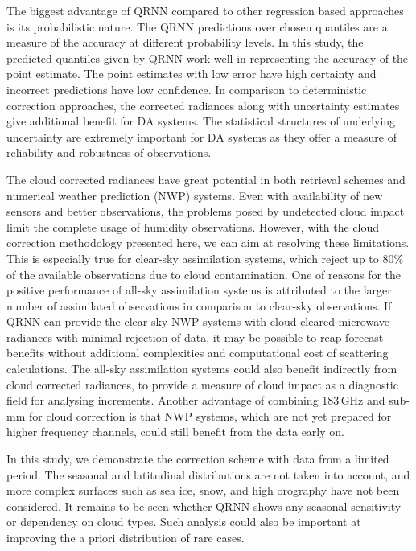 \documentclass[amt, manuscript]{copernicus}
\begin{document}
The biggest advantage of QRNN compared to other regression based approaches is its probabilistic nature. The QRNN predictions over chosen quantiles are a measure of the accuracy at different probability levels. In this study, the predicted quantiles given by QRNN work well in representing the accuracy of the point estimate. The point estimates with low error have high certainty and incorrect predictions have low confidence. In comparison to deterministic correction approaches, the corrected radiances along with uncertainty estimates give additional benefit for DA systems. The statistical structures of underlying uncertainty are extremely important for DA systems as they offer a measure of reliability and robustness of observations.

The cloud corrected radiances have great potential in both retrieval schemes and numerical weather prediction (NWP) systems. Even with availability of new sensors and better observations, the problems posed by undetected cloud impact limit the complete usage of humidity observations. However, with the cloud correction methodology presented here, we can aim at resolving these limitations. This is especially true for clear-sky assimilation systems, which reject up to 80\% of the available observations due to cloud contamination. One of reasons for the positive performance of all-sky assimilation systems is attributed to the larger number of assimilated observations in comparison to clear-sky observations. If QRNN can provide the clear-sky NWP systems with cloud cleared microwave radiances with minimal rejection of data, it may be possible to reap forecast benefits without additional complexities and computational cost of scattering calculations. The all-sky assimilation systems could also benefit indirectly from cloud corrected radiances, to provide a measure of cloud impact as a diagnostic field for analysing increments. Another advantage of combining 183\,GHz and sub-mm for cloud correction is that NWP systems, which are not yet prepared for higher frequency channels, could still benefit from the data early on. 

In this study, we demonstrate the correction scheme with data from a limited period. The seasonal and latitudinal distributions are not taken into account, and more complex surfaces such as sea ice, snow, and high orography have not been considered. It remains to be seen whether QRNN shows any seasonal sensitivity or dependency on cloud types. Such analysis could also be important at improving the a priori distribution of rare cases. 
\end{document}
